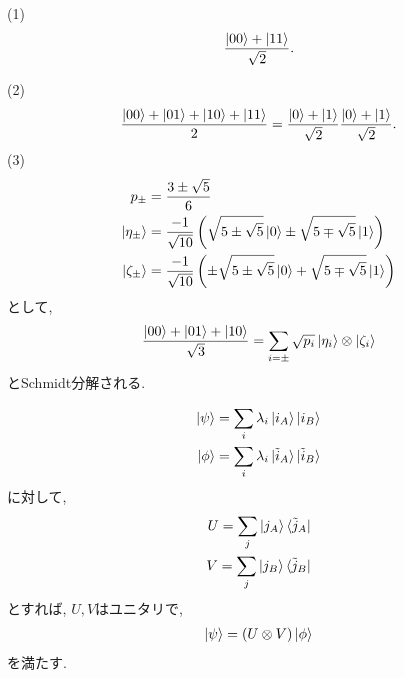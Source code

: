 \begin{ex}
    \label{ex2.79}
    (1)\
    \begin{align*}
        \frac{\ket{00} + \ket{11}}{\sqrt{2}}.
    \end{align*}
    \par
    (2)\
    \begin{align*}
        \frac{\ket{00}+\ket{01}+\ket{10}+\ket{11}}{2} = \frac{\ket{0} + \ket{1}}{\sqrt{2}} \frac{\ket{0} + \ket{1}}{\sqrt{2}} .
    \end{align*}
    (3)\
    \begin{align*}
        p_{\pm} &= \frac{3 \pm \sqrt{5}}{6} \\
        \ket{\eta_\pm} &= \frac{-1}{\sqrt{10}} 
        \left( 
            \sqrt{5 \pm \sqrt{5} } \ket{0}
            \pm
            \sqrt{5 \mp \sqrt{5} } \ket{1}
        \right) \\
        \ket{\zeta_\pm} &= \frac{-1}{\sqrt{10}} 
        \left( 
            \pm \sqrt{5 \pm \sqrt{5} } \ket{0}
            +
            \sqrt{5 \mp \sqrt{5} } \ket{1}
        \right)
    \end{align*}
    として, 
    \begin{align*}
        \frac{\ket{00}+\ket{01} + \ket{10}}{\sqrt{3}} =
        \sum_{i = \pm} \sqrt{p_i} \ket{\eta_i} \otimes \ket{\zeta_i}
    \end{align*}
    とSchmidt分解される.
\end{ex}

\begin{ex}
    \label{ex2.80}
    \begin{align*}
        \ket{\psi} = \sum_i \lambda_i \ket{i_A}\ket{i_B}                  \\
        \ket{\phi} = \sum_i \lambda_i \ket{\tilde{i}_A} \ket{\tilde{i}_B} \\
    \end{align*}
    に対して,
    \begin{align*}
        U = \sum_j \ket{j_A} \bra{\tilde{j}_A} \\
        V= \sum_j \ket{j_B} \bra{\tilde{j}_B}  \\
    \end{align*}
    とすれば, $U,V$はユニタリで,
    \begin{align*}
        \ket{\psi} = (U \otimes V)\ket{\phi}
    \end{align*}
    を満たす.
\end{ex}

